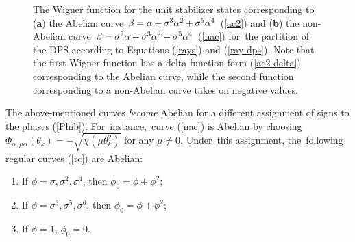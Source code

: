 \documentclass[quantumrep,article,accept,pdftex,moreauthors]{Definitions/mdpi}
\begin{document}
\begin{figure}[H]
\hspace{-10pt}  
  \quad 
  \caption{
    The Wigner function for the unit stabilizer states corresponding to (\textbf{a}) the
    Abelian curve $\protect\beta = \protect\alpha + \protect\sigma^3
    \protect\alpha^2 + \protect\sigma^5 \protect\alpha^4$ (\protect\ref{ac2})
    and (\textbf{b}) the non-Abelian curve $\protect\beta = \protect\sigma^2 \protect
    \alpha + \protect\sigma^3 \protect\alpha^2 +
    \protect\sigma^{5}\protect\alpha^{4}$ (\protect\ref{nac}) for~the partition
    of the DPS according to Equations (\protect\ref{rays}) and (\protect\ref{ray
    dps}). Note that the first Wigner function has a delta function form
    (\protect\ref{ac2 delta}) corresponding to the Abelian curve, while the
    second function corresponding to a non-Abelian curve takes on negative
    values.
  }
  \label{fig2}
\end{figure}

The above-mentioned curves \textit{become} Abelian for a different assignment of
signs to the phases (\ref{Phib}). For~instance,~curve (\ref{nac}) is Abelian
by choosing
$\Phi_{\alpha,\mu\alpha}(\theta_{k})=-\sqrt{\chi\left(\mu\theta_{k}^{2}\right)}$
for any $\mu \neq 0$. Under~this assignment, the~following regular curves
(\ref{rc}) are Abelian:
\begin{enumerate}
  \item If $\phi = \sigma, \sigma^{2}, \sigma^{4}$, then $\phi_{0} = \phi +
    \phi^{2}$;

  \item If $\phi = \sigma^{3}, \sigma^{5}, \sigma^{6}$, then $\phi_{0} = \phi +
    \phi^{2}$;

  \item If $\phi = 1$, $\phi_{0} = 0$.
\end{enumerate}
\end{document}
